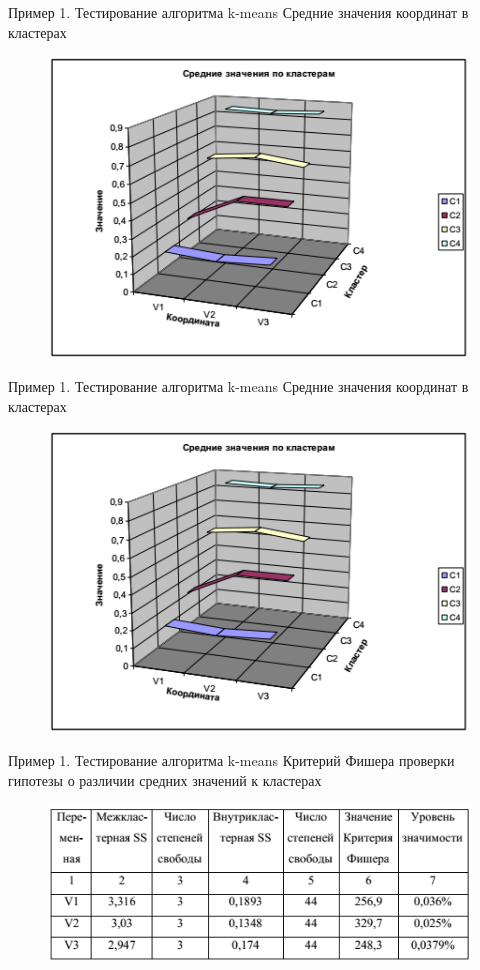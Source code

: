 \documentclass{beamer}
\begin{document}
\begin{frame}{Пример 1. Тестирование алгоритма k-means}
Средние значения координат в кластерах
\begin{figure}[h]
\centering
\includegraphics[scale=0.7]{images/lec07-pic40.png}
\end{figure}
\end{frame}

\begin{frame}{Пример 1. Тестирование алгоритма k-means}
Средние значения координат в кластерах
\begin{figure}[h]
\centering
\includegraphics[scale=0.7]{images/lec07-pic40.png}
\end{figure}
\end{frame}

\begin{frame}{Пример 1. Тестирование алгоритма k-means}
Критерий Фишера проверки гипотезы о различии средних значений к кластерах
\begin{figure}[h]
\centering
\includegraphics[scale=0.7]{images/lec07-pic41.png}
\end{figure}
\end{frame}
\end{document}
